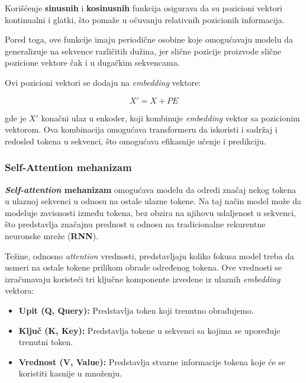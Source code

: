\documentclass[12pt]{article}
\begin{document}
   Korišćenje \textbf{sinusnih} i \textbf{kosinusnih} funkcija osigurava da su pozicioni vektori
   kontinualni i glatki, što pomaže u očuvanju relativnih pozicionih informacija. 
   
   Pored toga, ove funkcije imaju periodične osobine koje omogućavaju modelu da 
   generalizuje na sekvence različitih dužina, jer slične pozicije proizvode slične 
   pozicione vektore čak i u dugačkim sekvencama.

   Ovi pozicioni vektori se dodaju na \textit{embedding} vektore:

   \[
   X' = X + PE
   \]

   gde je \(X'\) konačni ulaz u enkoder, koji kombinuje \textit{embedding} vektor 
   sa pozicionim vektorom. Ova kombinacija omogućava transformeru da 
   iskoristi i sadržaj i redosled tokena u sekvenci, što omogućava efikasnije 
   učenje i predikciju.

   \subsubsection*{Self-Attention mehanizam}
   \textbf{\textit{Self-attention} mehanizam} omogućava modelu da odredi značaj nekog 
   tokena u ulaznoj sekvenci u odnosu na ostale ulazne tokene. 
   Na taj način model može da modeluje zavisnosti između tokena, bez obzira na 
   njihovu udaljenost u sekvenci, što predstavlja značajnu prednost u odnosu na 
   tradicionalne rekurentne neuronske mreže (\textbf{RNN}).
 
   Težine, odnosno \textit{attention} vrednosti, predstavljaju koliko fokusa model treba 
   da usmeri na ostale tokene prilikom obrade određenog tokena. 
   Ove vrednosti se izračunavaju koristeći tri ključne komponente izvedene 
   iz ulaznih \textit{embedding} vektora:

   \begin{itemize}
      \item \textbf{Upit (Q, Query):} Predstavlja token koji trenutno obrađujemo.
      \item \textbf{Ključ (K, Key):} Predstavlja tokene u sekvenci sa kojima 
      se upoređuje trenutni token.
      \item \textbf{Vrednost (V, Value):} Predstavlja stvarne informacije tokena koje 
      će se koristiti kasnije u množenju.
  \end{itemize}
  
  \newpage
\end{document}
